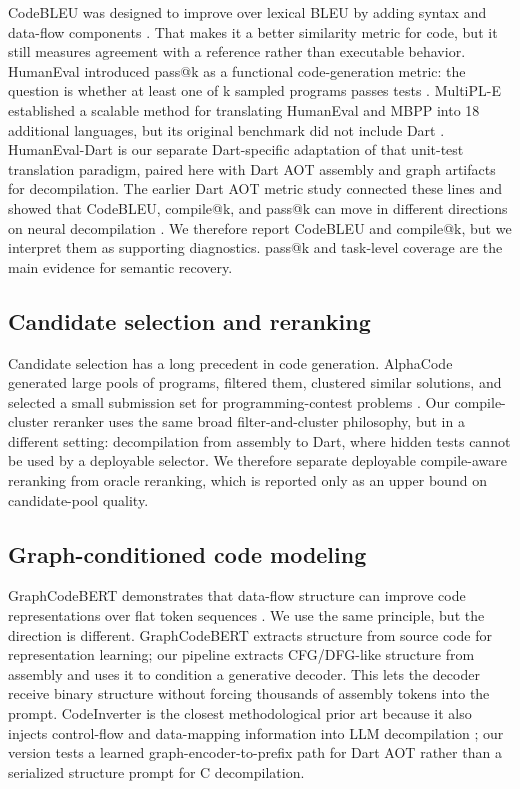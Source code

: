 \documentclass[11pt]{article}
\begin{document}
CodeBLEU was designed to improve over lexical BLEU by adding syntax and data-flow components \cite{ren2020codebleu}. That makes it a better similarity metric for code, but it still measures agreement with a reference rather than executable behavior. HumanEval introduced pass@k as a functional code-generation metric: the question is whether at least one of k sampled programs passes tests \cite{chen2021codex}. MultiPL-E established a scalable method for translating HumanEval and MBPP into 18 additional languages, but its original benchmark did not include Dart \cite{cassano2023multiple}. HumanEval-Dart is our separate Dart-specific adaptation of that unit-test translation paradigm, paired here with Dart AOT assembly and graph artifacts for decompilation. The earlier Dart AOT metric study connected these lines and showed that CodeBLEU, compile@k, and pass@k can move in different directions on neural decompilation \cite{abualazm2026tosem}. We therefore report CodeBLEU and compile@k, but we interpret them as supporting diagnostics. pass@k and task-level coverage are the main evidence for semantic recovery.

\subsection{Candidate selection and reranking}

Candidate selection has a long precedent in code generation. AlphaCode generated large pools of programs, filtered them, clustered similar solutions, and selected a small submission set for programming-contest problems \cite{li2022alphacode}. Our compile-cluster reranker uses the same broad filter-and-cluster philosophy, but in a different setting: decompilation from assembly to Dart, where hidden tests cannot be used by a deployable selector. We therefore separate deployable compile-aware reranking from oracle reranking, which is reported only as an upper bound on candidate-pool quality.

\subsection{Graph-conditioned code modeling}

GraphCodeBERT demonstrates that data-flow structure can improve code representations over flat token sequences \cite{guo2020graphcodebert}. We use the same principle, but the direction is different. GraphCodeBERT extracts structure from source code for representation learning; our pipeline extracts CFG/DFG-like structure from assembly and uses it to condition a generative decoder. This lets the decoder receive binary structure without forcing thousands of assembly tokens into the prompt. CodeInverter is the closest methodological prior art because it also injects control-flow and data-mapping information into LLM decompilation \cite{liu2025codeinverter}; our version tests a learned graph-encoder-to-prefix path for Dart AOT rather than a serialized structure prompt for C decompilation.
\end{document}
